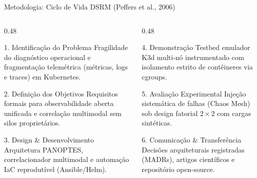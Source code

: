 \documentclass[aspectratio=169, 10pt]{beamer}
\begin{document}
\begin{frame}{Metodologia: Ciclo de Vida DSRM (Peffers et al., 2006)}
  \begin{columns}[T]
    \begin{column}{0.48\textwidth}
      \begin{block}{1. Identificação do Problema}
        \small Fragilidade do diagnóstico operacional e fragmentação telemétrica (métricas, logs e traces) em Kubernetes.
      \end{block}
      \vspace{0.6ex}
      \begin{block}{2. Definição dos Objetivos}
        \small Requisitos formais para observabilidade aberta unificada e correlação multimodal sem silos proprietários.
      \end{block}
      \vspace{0.6ex}
      \begin{block}{3. Design \& Desenvolvimento}
        \small Arquitetura PANOPTES, correlacionador multimodal e automação IaC reprodutível (Ansible/Helm).
      \end{block}
    \end{column}
    
    \begin{column}{0.48\textwidth}
      \begin{block}{4. Demonstração}
        \small Testbed emulador K3d multi-nó instrumentado com isolamento estrito de contêineres via cgroups.
      \end{block}
      \vspace{0.6ex}
      \begin{block}{5. Avaliação Experimental}
        \small Injeção sistemática de falhas (Chaos Mesh) sob design fatorial $2\times2$ com cargas sintéticas.
      \end{block}
      \vspace{0.6ex}
      \begin{block}{6. Comunicação \& Transferência}
        \small Decisões arquiteturais registradas (MADRs), artigos científicos e repositório open-source.
      \end{block}
    \end{column}
  \end{columns}
\end{frame}
\end{document}
